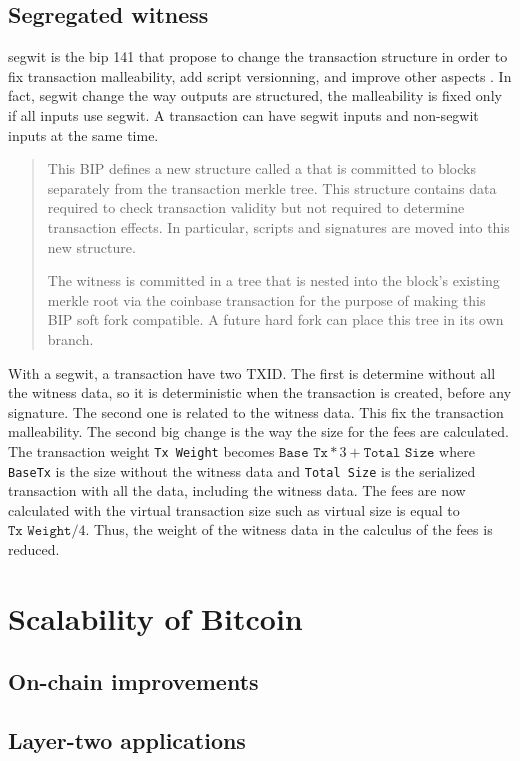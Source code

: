 \subsection{Segregated witness}

\gls{segwit} is the \gls{bip} 141 that propose to change the transaction structure
in order to fix transaction malleability, add script versionning, and improve other
aspects \cite{SegWit, SegWitBIP}. In fact, \gls{segwit} change the way outputs are
structured, the malleability is fixed only if all inputs use \gls{segwit}. A
transaction can have \gls{segwit} inputs and non-\gls{segwit} inputs at the same
time.

\begin{quote}
  This BIP defines a new structure called a  that is committed to
  blocks separately from the transaction merkle tree. This structure contains
  data required to check transaction validity but not required to determine
  transaction effects. In particular, scripts and signatures are moved into this
  new structure.

  The witness is committed in a tree that is nested into the block's existing
  merkle root via the coinbase transaction for the purpose of making this BIP
  soft fork compatible. A future hard fork can place this tree in its own branch.
\end{quote}

With a \gls{segwit}, a transaction have two TXID. The first is determine without
all the witness data, so it is deterministic when the transaction is created,
before any signature. The second one is related to the witness data. This fix
the transaction malleability. The second big change is the way the size for the
fees are calculated. The transaction weight \texttt{Tx Weight} becomes
$\texttt{Base Tx} * 3 + \texttt{Total Size}$ where \texttt{BaseTx} is the size
without the witness data and \texttt{Total Size} is the serialized transaction
with all the data, including the witness data.
The fees are now calculated with the virtual transaction size such as virtual
size is equal to $\texttt{Tx Weight} / 4$. Thus, the weight of the witness data
in the calculus of the fees is reduced.

\section{Scalability of Bitcoin}


\subsection{On-chain improvements}
\subsection{Layer-two applications}
